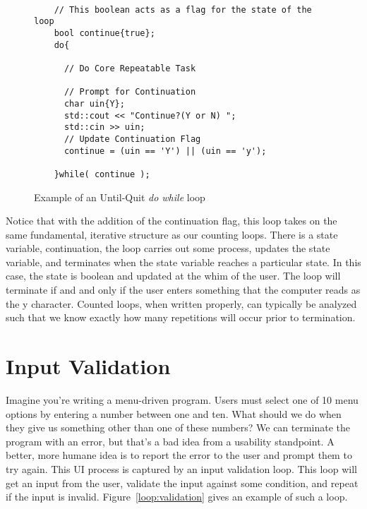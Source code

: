 \documentclass[]{tufte-handout}
\begin{document}
\begin{figure}
  \begin{lstlisting}

    // This boolean acts as a flag for the state of the loop
    bool continue{true};
    do{

      // Do Core Repeatable Task

      // Prompt for Continuation
      char uin{Y};
      std::cout << "Continue?(Y or N) ";
      std::cin >> uin;
      // Update Continuation Flag
      continue = (uin == 'Y') || (uin == 'y');

    }while( continue );
  \end{lstlisting}
  \caption{Example of an Until-Quit \textit{do while} loop}
\label{loop:untilquit}
\end{figure}

Notice that with the addition of the continuation flag, this loop takes on the same fundamental, iterative structure as our counting loops. There is a state variable, continuation, the loop carries out some process, updates the state variable, and terminates when the state variable reaches a particular state. In this case, the state is boolean and updated at the whim of the user. The loop will terminate if and and only if the user enters something that the computer reads as the y character. Counted loops, when written properly, can typically be analyzed such that we know exactly how many repetitions will occur prior to termination.

\section{Input Validation}

Imagine you're writing a menu-driven program. Users must select one of 10 menu options by entering a number between one and ten. What should we do when they give us something other than one of these numbers?  We can terminate the program with an error, but that's a bad idea from a usability standpoint.  A better, more humane idea is to report the error to the user and prompt them to try again. This UI process is captured by an input validation loop. This loop will get an input from the user, validate the input against some condition, and repeat if the input is invalid.  Figure~\ref{loop:validation} gives an example of such a loop.
\end{document}
